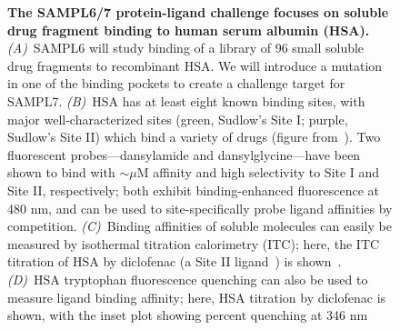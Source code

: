 \documentclass[11pt]{article}
\begin{document}
\begin{figure}[h]
\begin{centering}

\end{centering}
\vspace{0.1in}
\caption{\footnotesize {\bf The SAMPL6/7 protein-ligand challenge focuses on soluble drug fragment binding to human serum albumin (HSA).}
\emph{(A)}~SAMPL6 will study binding of a library of 96 small soluble drug fragments to recombinant HSA.
We will introduce a mutation in one of the binding pockets to create a challenge target for SAMPL7.
\emph{(B)}~HSA has at least eight known binding sites, with major well-characterized sites (green, Sudlow's Site I; purple, Sudlow's Site II) which bind a variety of drugs%
(figure from~\cite{Hall:2013:JournalofChemicalInformationandModeling}).
Two fluorescent probes---dansylamide and dansylglycine---have been shown to bind with $\sim$$\mu$M affinity and high selectivity to Site I and Site II, respectively; both exhibit binding-enhanced fluorescence at 480 nm, and can be used to site-specifically probe ligand affinities by competition.
\emph{(C)}~Binding affinities of soluble molecules can easily be measured by isothermal titration calorimetry (ITC); here, the ITC titration of HSA by diclofenac (a Site II ligand~\cite{Rafols:2014:Talanta}) is shown~\cite{Bou-Abdallah:2016:TheJournalofChemicalThermodynamics}. 
\emph{(D)}~HSA tryptophan fluorescence quenching can also be used to measure ligand binding affinity; here, HSA titration by diclofenac is shown, with the inset plot showing percent quenching at 346 nm~\cite{Epps:1999:JournalofPharmacyandPharmacology,Bou-Abdallah:2016:TheJournalofChemicalThermodynamics}
\label{figure:hsa-challenge}}
\end{figure}
\end{document}
